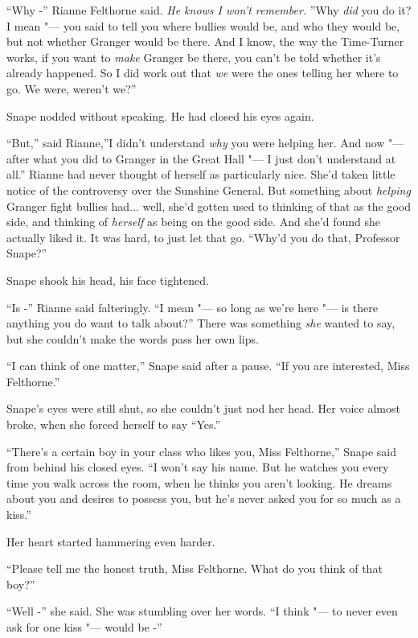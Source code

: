 ``Why -'' Rianne Felthorne said. \emph{He knows I won't remember.} ''Why
\emph{did} you do it? I mean "--- you said to tell you where bullies would
be, and who they would be, but not whether Granger would be there. And I
know, the way the Time-Turner works, if you want to \emph{make} Granger
be there, you can't be told whether it's already happened. So I did work
out that \emph{we} were the ones telling her where to go. We were,
weren't we?''

Snape nodded without speaking. He had closed his eyes again.

``But,'' said Rianne,''I didn't understand \emph{why} you were helping
her. And now "--- after what you did to Granger in the Great Hall "--- I just
don't understand at all.'' Rianne had never thought of herself as
particularly nice. She'd taken little notice of the controversy over the
Sunshine General. But something about \emph{helping} Granger fight
bullies had... well, she'd gotten used to thinking of that as the
good side, and thinking of \emph{herself} as being on the good side. And
she'd found she actually liked it. It was hard, to just let that go.
``Why'd you do that, Professor Snape?''

Snape shook his head, his face tightened.

``Is -'' Rianne said falteringly. ``I mean "--- so long as we're here "--- is
there anything you do want to talk about?'' There was something
\emph{she} wanted to say, but she couldn't make the words pass her own
lips.

``I can think of one matter,'' Snape said after a pause. ``If you are
interested, Miss Felthorne.''

Snape's eyes were still shut, so she couldn't just nod her head. Her
voice almost broke, when she forced herself to say ``Yes.''

``There's a certain boy in your class who likes you, Miss Felthorne,''
Snape said from behind his closed eyes. ``I won't say his name. But he
watches you every time you walk across the room, when he thinks you
aren't looking. He dreams about you and desires to possess you, but he's
never asked you for so much as a kiss.''

Her heart started hammering even harder.

``Please tell me the honest truth, Miss Felthorne. What do you think of
that boy?''

``Well -'' she said. She was stumbling over her words. ``I think "--- to
never even ask for one kiss "--- would be -''

